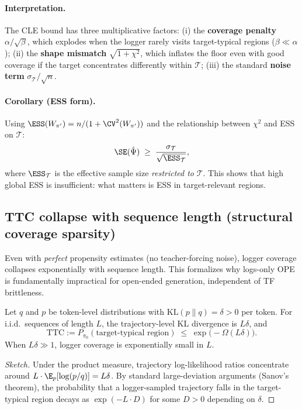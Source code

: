 \paragraph{Interpretation.}
The CLE bound has three multiplicative factors:
(i) the \textbf{coverage penalty} $\alpha/\sqrt{\beta}$, which explodes when the logger rarely visits target-typical regions ($\beta \ll \alpha$);
(ii) the \textbf{shape mismatch} $\sqrt{1+\chi^2}$, which inflates the floor even with good coverage if the target concentrates differently within $\mathcal{T}$;
(iii) the standard \textbf{noise term} $\sigma_{\mathcal{T}}/\sqrt{n}$.

\paragraph{Corollary (ESS form).}
Using $\ESS(W_{\pi'}) = n / (1 + \CV^2(W_{\pi'}))$ and the relationship between $\chi^2$ and ESS on $\mathcal{T}$:
\[
\SE(\hat\Psi) \;\ge\; \frac{\sigma_{\mathcal{T}}}{\sqrt{\ESS_{\mathcal{T}}}},
\]
where $\ESS_{\mathcal{T}}$ is the effective sample size \emph{restricted to} $\mathcal{T}$. This shows that high global ESS is insufficient: what matters is ESS in target-relevant regions.

\subsection{TTC collapse with sequence length (structural coverage sparsity)}
\label{app:ttc-collapse}

Even with \emph{perfect} propensity estimates (no teacher-forcing noise), logger coverage collapses exponentially with sequence length. This formalizes why logs-only OPE is fundamentally impractical for open-ended generation, independent of TF brittleness.

\begin{proposition}
\label{prop:ttc-collapse}
Let $q$ and $p$ be token-level distributions with $\mathrm{KL}(p \| q) = \delta > 0$ per token.
For i.i.d.\ sequences of length $L$, the trajectory-level KL divergence is $L \delta$, and
\[
\mathrm{TTC} := P_{\pi_0}(\text{target-typical region}) \;\le\; \exp\bigl(-\Omega(L \delta)\bigr).
\]
When $L \delta \gg 1$, logger coverage is exponentially small in $L$.
\end{proposition}

\begin{proof}[Sketch]
Under the product measure, trajectory log-likelihood ratios concentrate around $L \cdot \E_p[\log(p/q)] = L \delta$.
By standard large-deviation arguments (Sanov's theorem), the probability that a logger-sampled trajectory falls in the target-typical region decays as $\exp(-L \cdot D)$ for some $D > 0$ depending on $\delta$.
\end{proof}


